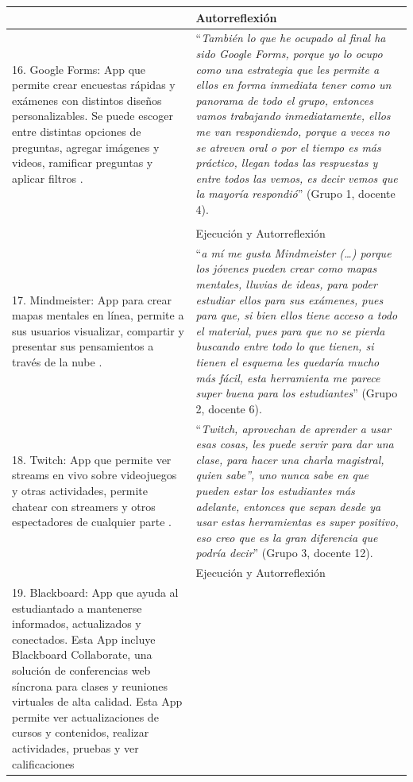 \documentclass[spanish]{textolivre}
\begin{document}
\begin{longtable}{p{}p{}}
\\
\midrule
& Autorreflexión
\\
\midrule
16. Google Forms: App que permite crear encuestas rápidas y exámenes con distintos diseños personalizables. Se puede escoger entre distintas opciones de preguntas, agregar imágenes y videos, ramificar preguntas y aplicar filtros \cite{google_workspace_google_2021}. &
“\emph{También lo que he ocupado al final ha sido Google Forms, porque yo lo ocupo como una estrategia que les permite a ellos en forma inmediata tener como un panorama de todo el grupo, entonces vamos trabajando inmediatamente, ellos me van respondiendo, porque a veces no se atreven oral o por el tiempo es más práctico, llegan todas las respuestas y entre todos las vemos, es decir vemos que la mayoría respondió}” (Grupo 1, docente 4).
\\
\vspace{7em} \\
\midrule
& Ejecución y Autorreflexión
\\
\midrule
17. Mindmeister: App para crear mapas mentales en línea, permite a sus usuarios visualizar, compartir y presentar sus pensamientos a través de la nube \cite{meisterslabs_crea_2021}. &
“\emph{a mí me gusta Mindmeister (…) porque los jóvenes pueden crear como mapas mentales, lluvias de ideas, para poder estudiar ellos para sus exámenes, pues para que, si bien ellos tiene acceso a todo el material, pues para que no se pierda buscando entre todo lo que tienen, si tienen el esquema les quedaría mucho más fácil, esta herramienta me parece super buena para los estudiantes}” (Grupo 2, docente 6).
\\
18. Twitch: App que permite ver streams en vivo sobre videojuegos y otras actividades, permite chatear con streamers y otros espectadores de cualquier parte \cite{twitch_interactive_inc._twitch_2021}. &
“\emph{Twitch, aprovechan de aprender a usar esas cosas, les puede servir para dar una clase, para hacer una charla magistral, quien sabe”, uno nunca sabe en que pueden estar los estudiantes más adelante, entonces que sepan desde ya usar estas herramientas es super positivo, eso creo que es la gran diferencia que podría decir}” (Grupo 3, docente 12).
\\
\midrule
& Ejecución y Autorreflexión
\\
\midrule
19. Blackboard: App que ayuda al estudiantado a mantenerse informados, actualizados y conectados. Esta App incluye Blackboard Collaborate, una solución de conferencias web síncrona para clases y reuniones virtuales de alta calidad. Esta App permite ver actualizaciones de cursos y contenidos, realizar actividades, pruebas y ver calificaciones \cite{blackboardinc2021} &

\end{longtable}
\end{document}
